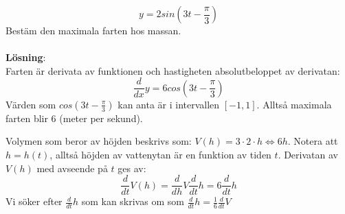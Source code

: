 \documentclass{report}
\begin{document}
{
\begin{equation*}
y = 2sin(3t - \frac{\pi}{3}  )
\end{equation*}
Bestäm den maximala farten hos massan.\\\\

\textbf{Lösning}:\\
Farten är derivata av funktionen och hastigheten absolutbeloppet av derivatan:
\begin{equation*}
\frac{d}{dx}y = 6cos(3t - \frac{\pi}{3} )
\end{equation*}
Värden som $ cos(3t - \frac{\pi}{3} ) $ kan anta är i intervallen $ [-1,1] $. Alltså maximala farten blir $ 6 $ (meter per sekund).
}

{
Volymen som beror av höjden beskrivs som: $ V(h) = 3 \cdot 2 \cdot h \iff 6h $. Notera att $ h = h(t) $, alltså höjden av vattenytan är en funktion av tiden $ t $. Derivatan av $ V(h) $ med avseende på $ t $ ges av:
\begin{equation*}
\frac{d}{dt}V(h) = \frac{d}{dh}V \frac{d}{dt} h = 6\frac{d}{dt}h
\end{equation*}
Vi söker efter $ \frac{d}{dt} h $ som kan skrivas om som $ \frac{d}{dt}h = \frac{1}{6}  \frac{d}{dt}V $ 
}
\end{document}
